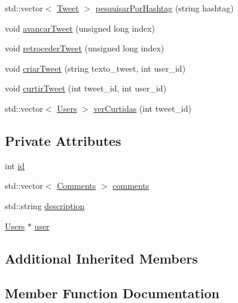 \begin{DoxyCompactItemize}
\item 
std\+::vector$<$ \hyperlink{class_tweet}{Tweet} $>$ \hyperlink{class_tweet_a078594cc97b6ecdd8da0eb4db315bd75}{pesquisar\+Por\+Hashtag} (string hashtag)
\item 
void \hyperlink{class_tweet_a044e3e2dc96af47cf44cbef3544e90bb}{avancar\+Tweet} (unsigned long index)
\item 
void \hyperlink{class_tweet_ad596dc45a95674b8197fed0636472053}{retroceder\+Tweet} (unsigned long index)
\item 
void \hyperlink{class_tweet_a597b72b7ece65d9a1a77d4f9de83477a}{criar\+Tweet} (string texto\+\_\+tweet, int user\+\_\+id)
\item 
void \hyperlink{class_tweet_a77af03b416c030006b97482676c03c81}{curtir\+Tweet} (int tweet\+\_\+id, int user\+\_\+id)
\item 
std\+::vector$<$ \hyperlink{class_users}{Users} $>$ \hyperlink{class_tweet_a85dfc231458b7595ab1ca1a7ca88e36e}{ver\+Curtidas} (int tweet\+\_\+id)
\end{DoxyCompactItemize}
\subsection*{Private Attributes}
\begin{DoxyCompactItemize}
\item 
int \hyperlink{class_tweet_a3e7ab9402d5ed1126a432b266c2b9f22}{id}
\item 
std\+::vector$<$ \hyperlink{class_comments}{Comments} $>$ \hyperlink{class_tweet_a710dd5d27fc8eb0e068e5dd334634d57}{comments}
\item 
std\+::string \hyperlink{class_tweet_abc8726cb97ee5d2447dd30b35d52b9d1}{description}
\item 
\hyperlink{class_users}{Users} $\ast$ \hyperlink{class_tweet_a084d33216fa5d5a1e7dfe1a3e1730fdd}{user}
\end{DoxyCompactItemize}
\subsection*{Additional Inherited Members}


\subsection{Member Function Documentation}
\mbox{\label{class_tweet_a044e3e2dc96af47cf44cbef3544e90bb}} 
